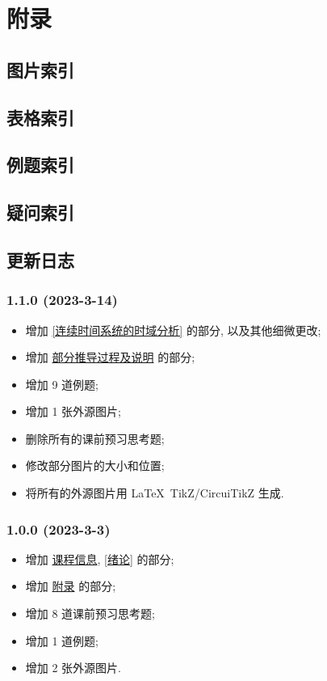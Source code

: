\section{附录} \label{附录}
\subsection{图片索引} \label{图片索引}
\makeatletter
{}
\makeatother

\subsection{表格索引} \label{表格索引}
\makeatletter
{}
\makeatother

\subsection{例题索引} \label{例题索引}
\listofexampleprobs

\subsection{疑问索引} \label{疑问索引}
\listofquestions

\subsection{更新日志} \label{更新日志}
\subsubsection*{1.1.0 (2023-3-14)}
\begin{itemize}
    \item 增加 \ref{连续时间系统的时域分析} 的部分, 以及其他细微更改;
    \item 增加 \hyperref[部分推导过程及说明]{部分推导过程及说明} 的部分;
    \item 增加 9 道例题;
    \item 增加 1 张外源图片;
    \item 删除所有的课前预习思考题;
    \item 修改部分图片的大小和位置;
    \item 将所有的外源图片用 \LaTeX\ TikZ/CircuiTikZ 生成.
\end{itemize}

\subsubsection*{1.0.0 (2023-3-3)}
\begin{itemize}
    \item 增加 \hyperref[课程信息]{课程信息}, \ref{绪论} 的部分;
    \item 增加 \hyperref[附录]{附录} 的部分;
    \item 增加 8 道课前预习思考题;
    \item 增加 1 道例题;
    \item 增加 2 张外源图片.
\end{itemize}
